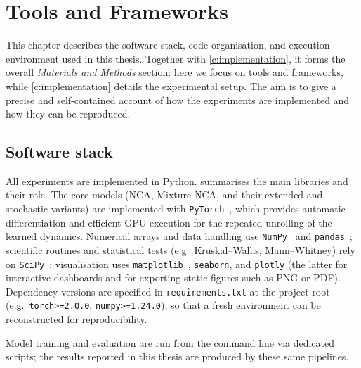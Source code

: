 \chapter{Tools and Frameworks}
\label{c:tools}

This chapter describes the software stack, code organisation, and execution environment used in this thesis.
Together with \cref{c:implementation}, it forms the overall \emph{Materials and Methods} section: here we focus on tools and frameworks, while \cref{c:implementation} details the experimental setup.
The aim is to give a precise and self-contained account of how the experiments are implemented and how they can be reproduced.

\section{Software stack}

All experiments are implemented in Python.
 summarises the main libraries and their role.
The core models (NCA, Mixture NCA, and their extended and stochastic variants) are implemented with \texttt{PyTorch}~\cite{pytorch}, which provides automatic differentiation and efficient GPU execution for the repeated unrolling of the learned dynamics.
Numerical arrays and data handling use \texttt{NumPy}~\cite{harris2020numpy} and \texttt{pandas}~\cite{reback2020pandas}; scientific routines and statistical tests (e.g.\ Kruskal--Wallis, Mann--Whitney) rely on \texttt{SciPy}~\cite{virtanen2020scipy}; visualisation uses \texttt{matplotlib}~\cite{hunter2007matplotlib,matplotlib_zenodo}, \texttt{seaborn}, and \texttt{plotly} (the latter for interactive dashboards and for exporting static figures such as PNG or PDF).
Dependency versions are specified in \texttt{requirements.txt} at the project root (e.g.\ \texttt{torch>=2.0.0}, \texttt{numpy>=1.24.0}), so that a fresh environment can be reconstructed for reproducibility.

Model training and evaluation are run from the command line via dedicated scripts; the results reported in this thesis are produced by these same pipelines.

